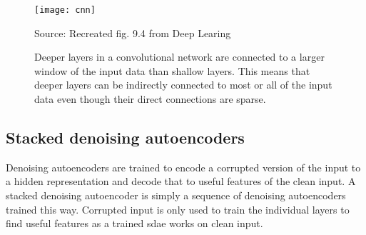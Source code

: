 \begin{figure}[H]
\centering
\texttt{[image: cnn]}
\caption*{Source: Recreated fig. 9.4 from Deep Learing~\cite{DEEP_LEARNING}}
\caption{Deeper layers in a convolutional network are connected to a larger window of the
         input data than shallow layers. This means that deeper layers can be indirectly
         connected to most or all of the input data even though their direct connections
         are sparse.~\cite{DEEP_LEARNING}}
\end{figure}

\subsection{Stacked denoising autoencoders}
Denoising autoencoders are trained to encode a corrupted version of the input to a
hidden representation and decode that to useful features of the clean input. A stacked
denoising autoencoder is simply a sequence of denoising autoencoders trained this way.
Corrupted input is only used to train the individual layers to find useful features
as a trained \ac{sdae} works on clean input.~\cite{SDAE}
